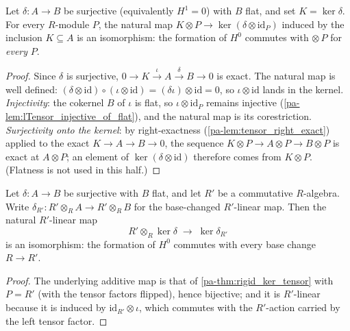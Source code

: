 \begin{theorem}
  \label{pa-thm:rigid_ker_tensor}
  \leanok

  Let \(\delta : A \to B\) be surjective (equivalently \(H^1 = 0\)) with \(B\) flat, and
  set \(K = \ker \delta\). For every \(R\)-module \(P\), the natural map
  \(K \otimes P \to \ker(\delta \otimes \mathrm{id}_P)\) induced by the inclusion
  \(K \subseteq A\) is an isomorphism: the formation of \(H^0\) commutes with
  \(\otimes\, P\) for \emph{every} \(P\).
\end{theorem}
\begin{proof}
  \leanok
  Since \(\delta\) is surjective, \(0 \to K \xrightarrow{\iota} A \xrightarrow{\delta}
  B \to 0\) is exact. The natural map is well defined:
  \((\delta \otimes \mathrm{id}) \circ (\iota \otimes \mathrm{id}) =
  (\delta \iota) \otimes \mathrm{id} = 0\), so \(\iota \otimes \mathrm{id}\) lands in
  the kernel. \emph{Injectivity}: the cokernel \(B\) of \(\iota\) is flat, so
  \(\iota \otimes \mathrm{id}_P\) remains injective
  (\ref{pa-lem:lTensor_injective_of_flat}), and the natural map is its corestriction.
  \emph{Surjectivity onto the kernel}: by right-exactness
  (\ref{pa-lem:tensor_right_exact}) applied to the exact \(K \to A \to B \to 0\), the
  sequence \(K \otimes P \to A \otimes P \to B \otimes P\) is exact at \(A \otimes P\);
  an element of \(\ker(\delta \otimes \mathrm{id})\) therefore comes from
  \(K \otimes P\). (Flatness is not used in this half.)
\end{proof}

\begin{theorem}
  \label{pa-thm:rigid_ker_baseChange}
  \leanok

  Let \(\delta : A \to B\) be surjective with \(B\) flat, and let \(R'\) be a
  commutative \(R\)-algebra. Write \(\delta_{R'} : R' \otimes_R A \to R' \otimes_R B\)
  for the base-changed \(R'\)-linear map. Then the natural \(R'\)-linear map
  \[
    R' \otimes_R \ker \delta \;\longrightarrow\; \ker \delta_{R'}
  \]
  is an isomorphism: the formation of \(H^0\) commutes with every base change
  \(R \to R'\).
\end{theorem}
\begin{proof}
  \leanok
  The underlying additive map is that of \ref{pa-thm:rigid_ker_tensor} with \(P = R'\)
  (with the tensor factors flipped), hence bijective; and it is \(R'\)-linear because
  it is induced by \(\mathrm{id}_{R'} \otimes \iota\), which commutes with the
  \(R'\)-action carried by the left tensor factor.
\end{proof}

